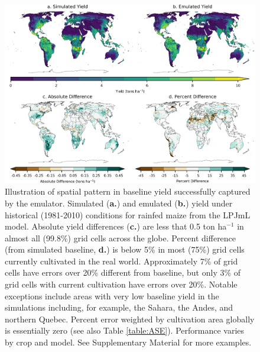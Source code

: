 \documentclass[gmd, manuscript]{copernicus} %
\begin{document}
\begin{figure}[ht]
\centering
    \includegraphics[width=16.0cm]{figures/lpjml_maize.png}
    \caption{
    Illustration of spatial pattern in baseline yield successfully captured by the emulator.
    Simulated (\textbf{a.}) and emulated (\textbf{b.}) yield under historical (1981-2010) conditions for rainfed maize from the LPJmL model.
    Absolute yield differences (\textbf{c.}) are less that 0.5 ton ha$^{-1}$ in almost all (99.8\%) grid cells across the globe.
    Percent difference (from simulated baseline, \textbf{d.}) is below 5\% in most (75\%) grid cells currently cultivated in the real world.
    Approximately 7\% of grid cells have errors over 20\% different from baseline, but only 3\% of grid cells with current cultivation %
	have errors over 20\%.
    Notable exceptions include areas with very low baseline yield in the simulations including, for example, the Sahara, the Andes, and northern Quebec. 
    Percent error weighted by cultivation area globally is essentially zero (see also Table \ref{table:ASE}).
    Performance varies by crop and model. 
    See Supplementary Material for more examples.
    }
   \label{fig:map_pattern}
\end{figure}
\end{document}
